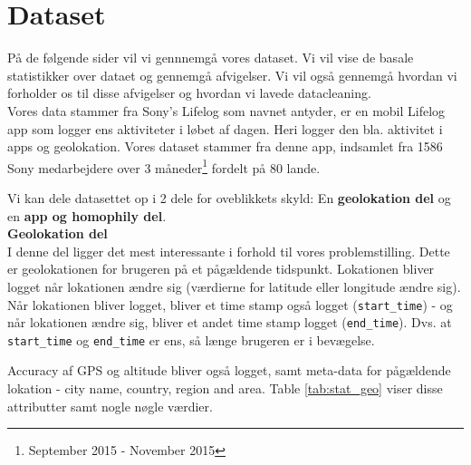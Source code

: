 \section{Dataset}
På de følgende sider vil vi gennnemgå vores dataset. Vi vil vise de basale statistikker over dataet og gennemgå afvigelser. Vi vil også gennemgå hvordan vi forholder os til disse afvigelser og hvordan vi lavede datacleaning. \\

Vores data stammer fra Sony's Lifelog\cite{sonyLifeLog} som navnet antyder, er en mobil Lifelog app som logger ens aktiviteter i løbet af dagen. Heri logger den bla. aktivitet i apps og geolokation. Vores dataset stammer fra denne app, indsamlet fra 1586 Sony medarbejdere over 3 måneder\footnote{September 2015 - November 2015} fordelt på 80 lande. 

Vi kan dele datasettet op i 2 dele for oveblikkets skyld: En \textbf{geolokation del} og en \textbf{app og homophily del}. \\


\textbf{Geolokation del}\\
I denne del ligger det mest interessante i forhold til vores problemstilling. Dette er geolokationen for brugeren på et pågældende tidspunkt. Lokationen bliver logget når lokationen ændre sig (værdierne for latitude eller longitude ændre sig). Når lokationen bliver logget, bliver et time stamp også logget (\texttt{start\_time}) - og når lokationen ændre sig, bliver et andet time stamp logget (\texttt{end\_time}). Dvs. at \texttt{start\_time} og \texttt{end\_time} er ens, så længe brugeren er i bevægelse.

Accuracy af GPS og altitude bliver også logget, samt meta-data for pågældende lokation - city name, country, region and area. Table \ref{tab:stat_geo} viser disse attributter samt nogle nøgle værdier. 

